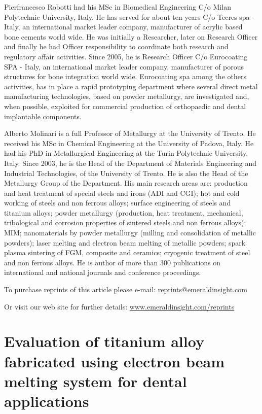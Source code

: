 \documentclass[10pt]{article}
\begin{document}
Pierfrancesco Robotti had his MSc in Biomedical Engineering C/o Milan Polytechnic University, Italy. He has served for about ten years C/o Tecres spa - Italy, an international market leader company, manufacturer of acrylic based bone cements world wide. He was initially a Researcher, later on Research Officer and finally he had Officer responsibility to coordinate both research and regulatory affair activities. Since 2005, he is Research Officer C/o Eurocoating SPA - Italy, an international market leader company, manufacturer of porous structures for bone integration world wide. Eurocoating spa among the others activities, has in place a rapid prototyping department where several direct metal manufacturing technologies, based on powder metallurgy, are investigated and, when possible, exploited for commercial production of orthopaedic and dental implantable components.

Alberto Molinari is a full Professor of Metallurgy at the University of Trento. He received his MSc in Chemical Engineering at the University of Padova, Italy. He had his PhD in Metallurgical Engineering at the Turin Polytechnic University, Italy. Since 2003, he is the Head of the Department of Materials Engineering and Industrial Technologies, of the University of Trento. He is also the Head of the Metallurgy Group of the Department. His main research areas are: production and heat treatment of special steels and irons (ADI and CGI); hot and cold working of steels and non ferrous alloys; surface engineering of steels and titanium alloys; powder metallurgy (production, heat treatment, mechanical, tribological and corrosion properties of sintered steels and non ferrous alloys); MIM; nanomaterials by powder metallurgy (milling and consolidation of metallic powders); laser melting and electron beam melting of metallic powders; spark plasma sintering of FGM, composite and ceramics; cryogenic treatment of steel and non ferrous alloys. He is author of more than 300 publications on international and national journals and conference proceedings.

To purchase reprints of this article please e-mail: \href{mailto:reprints@emeraldinsight.com}{reprints@emeraldinsight.com}

Or visit our web site for further details: \href{http://www.emeraldinsight.com/reprints}{www.emeraldinsight.com/reprints}

\section*{Evaluation of titanium alloy fabricated using electron beam melting system for dental applications }
\end{document}
